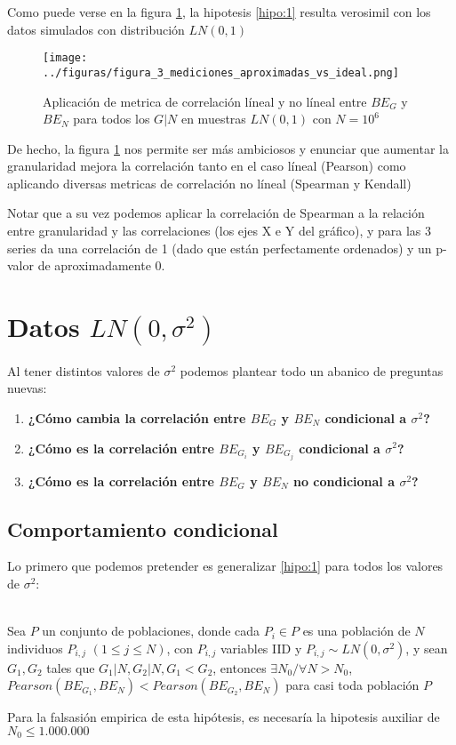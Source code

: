Como puede verse en la figura \ref{fig:3}, la hipotesis \ref{hipo:1} resulta verosimil con los datos simulados con distribución $LN(0,1)$ 

\begin{figure}[H]
    \centering 
    \texttt{[image: ../figuras/figura\_3\_mediciones\_aproximadas\_vs\_ideal.png]} %
    \caption{Aplicación de metrica de correlación líneal y no líneal entre $BE_G$ y $BE_N$ para todos los $G | N$ en muestras $LN(0,1)$ con $N=10^6$}
    \label{fig:3}
\end{figure}

De hecho, la figura \ref{fig:3} nos permite ser más ambiciosos y enunciar que aumentar la granularidad mejora la correlación tanto en el caso líneal (Pearson) como aplicando diversas metricas de correlación no líneal (Spearman y Kendall)

Notar que a su vez podemos aplicar la correlación de Spearman a la relación entre granularidad y las correlaciones (los ejes X e Y del gráfico), y para las 3 series da una correlación de 1 (dado que están perfectamente ordenados) y un p-valor de aproximadamente 0.

\section{Datos $LN(0,\sigma^2)$}

Al tener distintos valores de $\sigma^2$ podemos plantear todo un abanico de preguntas nuevas:

\begin{enumerate}
    \item \textbf{¿Cómo cambia la correlación entre $BE_G$ y $BE_N$ condicional a $\sigma^2$?}
    \item \textbf{¿Cómo es la correlación entre $BE_{G_i}$ y $BE_{G_j}$ condicional a $\sigma^2$?}
    \item \textbf{¿Cómo es la correlación entre $BE_G$ y $BE_N$ no condicional a $\sigma^2$?}
\end{enumerate}

\subsection{Comportamiento condicional}

Lo primero que podemos pretender es generalizar \ref{hipo:1} para todos los valores de $\sigma^2$:

\begin{hipotesis}\label{hipo:2}
    \\
    Sea $P$ un conjunto de poblaciones, donde cada $P_i \in P$ es una población de $N$ individuos $P_{i,j}$ $(1 \leq j \leq N)$, con $P_{i,j}$ variables IID y $P_{i,j} \sim LN(0,\sigma^2)$, y sean $G_1, G_2$ tales que $G_1|N, G_2|N, G_1 < G_2$, entonces $\exists N_0 / \forall N > N_0 $, $Pearson(BE_{G_1},BE_N) < Pearson(BE_{G_2},BE_N)$ para casi toda población $P$
    
    Para la falsasión empirica de esta hipótesis, es necesaría la hipotesis auxiliar de $N_0 \leq 1.000.000$  
\end{hipotesis}

